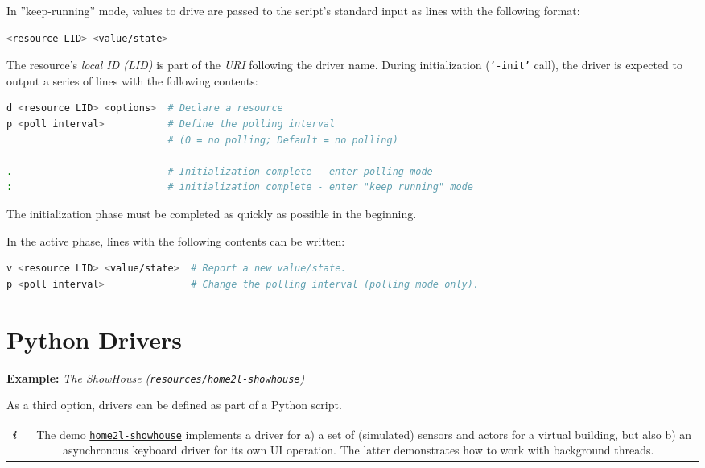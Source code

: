 \documentclass[12pt,english,parskip=half]{scrreprt}
\newcommand{\infobox}[1]{
  \hfill
  \setlength\arrayrulewidth{1pt}
  \begin{tabular}[t]{c|c|}
    \parbox{1.8em}{\hfill\textit{\Huge\textbf{i}\,}}
    &
    \,\parbox{0.89\linewidth}{\setlength{\parskip}{0.5em}#1}\,
  \end{tabular}
  \par
}
\newcommand{\idx}[1]{#1\index{#1}}
\newcommand{\toolref}[1]{\hyperref[tool:#1]{\texttt{\idx{#1}}}}
\begin{document}
In ''keep-running'' mode, values to drive are passed to the script's
standard input as lines with the following format:

\begin{lstlisting}[language=bash]
<resource LID> <value/state>
\end{lstlisting}

The resource's \emph{local ID (LID)} is part of the \emph{URI} following the driver name.
During initialization (\texttt{'-init'} call), the driver is expected
to output a series of lines with the following contents:

\begin{lstlisting}[language=bash]
d <resource LID> <options>  # Declare a resource
p <poll interval>           # Define the polling interval 
                            # (0 = no polling; Default = no polling)
                            
.                           # Initialization complete - enter polling mode
:                           # initialization complete - enter "keep running" mode
\end{lstlisting}

The initialization phase must be completed as quickly as possible in the beginning.

In the active phase, lines with the following contents can be written:

\begin{lstlisting}[language=bash]
v <resource LID> <value/state>  # Report a new value/state.
p <poll interval>               # Change the polling interval (polling mode only).
\end{lstlisting}





\section{Python Drivers}
\label{sec:drvdev-python}


\textbf{Example:} \emph{The ShowHouse (\texttt{resources/home2l-showhouse})}

As a third option, drivers can be defined as part of a Python script.

\infobox{
  The demo \toolref{home2l-showhouse} implements a driver for a) a set of (simulated) 
  sensors and actors for a virtual building, but also 
  b) an asynchronous keyboard driver for its own UI operation.
  The latter demonstrates how to work with background threads.
}
\end{document}
